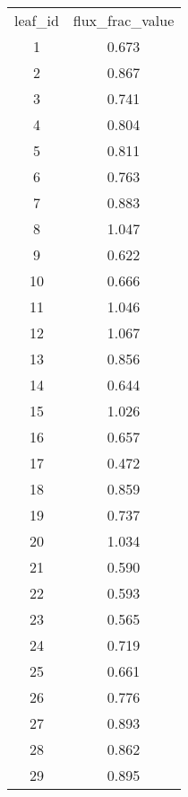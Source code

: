 \begin{table}
\begin{tabular}{cc}
leaf_id & flux_frac_value \\
1  &  0.673 \\
2  &  0.867 \\
3  &  0.741 \\
4  &  0.804 \\
5  &  0.811 \\
6  &  0.763 \\ %
7  &  0.883 \\
8  &  1.047 \\
9  &  0.622 \\
10 &  0.666 \\
11 &  1.046 \\
12 &  1.067 \\
13 &  0.856 \\
14 &  0.644 \\
15 &  1.026 \\
16 &  0.657 \\
17 &  0.472 \\ %
18 &  0.859 \\
19 &  0.737 \\
20 &  1.034 \\  %
21 &  0.590 \\
22 &  0.593 \\
23 &  0.565 \\ 
24 &  0.719 \\
25 &  0.661 \\
26 &  0.776 \\
27 &  0.893 \\
28 &  0.862 \\
29 &  0.895 \\



\end{tabular}
\end{table}
